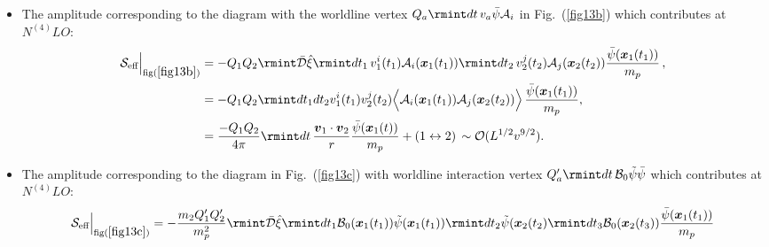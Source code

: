 \begin{itemize}
\begin{align}
\begin{split}
       =\frac{-Q_1'Q_2'}{4\pi }\rmint dt \,(\boldsymbol{v}_1 \cdot \boldsymbol{v}_2)\frac{e^{-\mu r}}{r}\frac{\Bar{\psi}(\boldsymbol{x}_1(t))}{m_p}+(1\leftrightarrow 2)\,\sim \mathcal{O}(L^{1/2}v^{9/2}).
    \end{split}
\end{align}
\item The amplitude corresponding to the diagram with the worldline vertex $Q_a\rmint dt\,v_a\Bar{\psi}\mathcal{A}_i$ in Fig.~(\ref{fig13b}) which contributes at $N^{(4)}LO :$ 
\begin{align}
    \begin{split}
         \mathcal{S}_{\text{eff}}\Big |_{\text{fig}(\ref{fig13b})}&=-Q_1 Q_2\rmint\Bar{\mathcal{D}}\Hat{\xi}\rmint dt_1\,v_1^i(t_1)\mathcal{A}_i(\boldsymbol{x}_1(t_1))\rmint dt_2 \,v_2^j(t_2)\mathcal{A}_j(\boldsymbol{x}_2(t_2))\frac{\Bar{\psi}(\boldsymbol{x}_1(t_1))}{m_p}\,,\\ &
         =-Q_1Q_2\rmint dt_1 dt_2 v_1^i(t_1)v_2^{j}(t_2)\Big\langle\mathcal{A}_i(\boldsymbol{x}_1(t_1))\mathcal{A}_j(\boldsymbol{x}_2(t_2))\Big\rangle\,\frac{\bar\psi(\boldsymbol{x}_1(t_1))}{m_p},\\ &
       =\frac{-Q_1Q_2}{4\pi }\rmint dt \,\frac{\boldsymbol{v}_1 \cdot \boldsymbol{v}_2}{r}\frac{\Bar{\psi}(\boldsymbol{x}_1(t))}{m_p}+(1\leftrightarrow 2)\,\sim \mathcal{O}(L^{1/2}v^{9/2}).
    \end{split}
\end{align}
\item The amplitude corresponding to the diagram in Fig.~(\ref{fig13c}) with worldline interaction vertex $Q_a'\rmint dt\,\mathcal{B}_0\Tilde{\psi}\Bar{\psi}$ which contributes at $N^{(4)}LO :$ 
\begin{align}
    \begin{split}
         \mathcal{S}_{\text{eff}}\Big |_{\text{fig}(\ref{fig13c})}&=-\frac{m_2Q_1'Q_2'}{m_p^2}\rmint\Bar{\mathcal{D}}\Hat{\xi}\rmint dt_1\mathcal{B}_0(\boldsymbol{x}_1(t_1))\Tilde{\psi}(\boldsymbol{x}_1(t_1))\rmint dt_2\Tilde{\psi}(\boldsymbol{x}_2(t_2)\rmint dt_3\mathcal{B}_0(\boldsymbol{x}_2(t_3))\frac{\Bar{\psi}(\boldsymbol{x}_1(t_1))}{m_p}\\&

\end{split}
\end{align}
\end{itemize}
